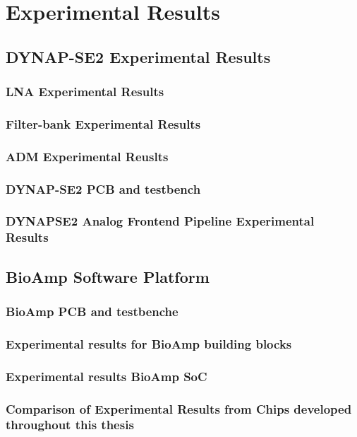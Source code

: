 \chapter{Experimental Results}
\label{chapte:expr}


\section{DYNAP-SE2 Experimental Results}
\subsection{LNA Experimental Results}
\subsection{Filter-bank Experimental Results}
\subsection{ADM Experimental Reuslts}
\subsection{DYNAP-SE2 PCB and testbench}
\subsection{DYNAPSE2 Analog Frontend Pipeline Experimental Results}

\section{BioAmp Software Platform}
\subsection{BioAmp PCB and testbenche}
\subsection{Experimental results for BioAmp building blocks}
\subsection{Experimental results BioAmp SoC}

\subsection{Comparison of Experimental Results from Chips developed throughout this thesis}